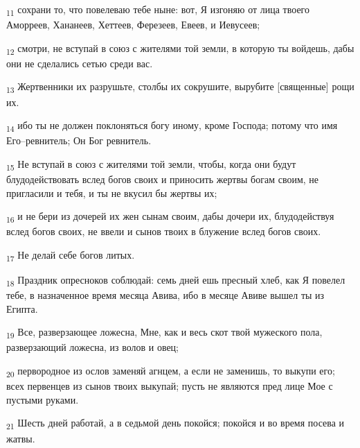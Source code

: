 \begin{tcolorbox}
\textsubscript{11} сохрани то, что повелеваю тебе ныне: вот, Я изгоняю от лица твоего Аморреев, Хананеев, Хеттеев, Ферезеев, Евеев, и Иевусеев;
\end{tcolorbox}
\begin{tcolorbox}
\textsubscript{12} смотри, не вступай в союз с жителями той земли, в которую ты войдешь, дабы они не сделались сетью среди вас.
\end{tcolorbox}
\begin{tcolorbox}
\textsubscript{13} Жертвенники их разрушьте, столбы их сокрушите, вырубите [священные] рощи их.
\end{tcolorbox}
\begin{tcolorbox}
\textsubscript{14} ибо ты не должен поклоняться богу иному, кроме Господа; потому что имя Его--ревнитель; Он Бог ревнитель.
\end{tcolorbox}
\begin{tcolorbox}
\textsubscript{15} Не вступай в союз с жителями той земли, чтобы, когда они будут блудодействовать вслед богов своих и приносить жертвы богам своим, не пригласили и тебя, и ты не вкусил бы жертвы их;
\end{tcolorbox}
\begin{tcolorbox}
\textsubscript{16} и не бери из дочерей их жен сынам своим, дабы дочери их, блудодействуя вслед богов своих, не ввели и сынов твоих в блужение вслед богов своих.
\end{tcolorbox}
\begin{tcolorbox}
\textsubscript{17} Не делай себе богов литых.
\end{tcolorbox}
\begin{tcolorbox}
\textsubscript{18} Праздник опресноков соблюдай: семь дней ешь пресный хлеб, как Я повелел тебе, в назначенное время месяца Авива, ибо в месяце Авиве вышел ты из Египта.
\end{tcolorbox}
\begin{tcolorbox}
\textsubscript{19} Все, разверзающее ложесна, Мне, как и весь скот твой мужеского пола, разверзающий ложесна, из волов и овец;
\end{tcolorbox}
\begin{tcolorbox}
\textsubscript{20} первородное из ослов заменяй агнцем, а если не заменишь, то выкупи его; всех первенцев из сынов твоих выкупай; пусть не являются пред лице Мое с пустыми руками.
\end{tcolorbox}
\begin{tcolorbox}
\textsubscript{21} Шесть дней работай, а в седьмой день покойся; покойся и во время посева и жатвы.
\end{tcolorbox}

